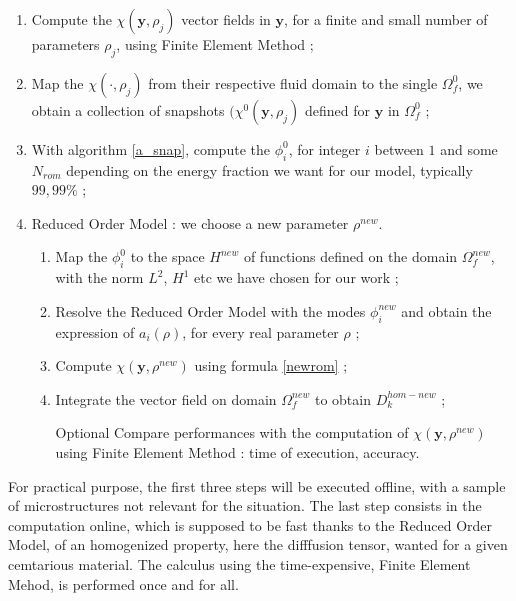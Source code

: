 \begin{algo}\label{a_rom}
\begin{enumerate}[label=\textbf{S \hspace{-7pt} \Roman*}]
\item Compute the $\chi\left(\mathbf{y},\rho_j\right)$ vector fields in $\mathbf{y}$, for a finite and small number of parameters $\rho_j$, %
using Finite Element Method ;
\item Map the $\chi (\cdot,\rho_j)$ from their respective fluid domain to the single $\Omega_f^0$, we obtain a collection of snapshots $(\chi^0(\mathbf{y},\rho_j)$ %
defined for $\mathbf{y}$ in $\Omega_f^0$ ;
\item With algorithm \ref{a_snap}, compute the $\phi^0_i$, for integer $i$ between $1$ and some $N_{rom}$ depending on the energy fraction we want for our model, typically $99,99\%$ ;
\item Reduced Order Model : we choose a new parameter $\rho^{new}$.
\begin{enumerate}[label=(\textbf{se}\ \roman*)]
\item Map the $\phi_i^0$ to the space $H^{new}$ of functions defined on the domain $\Omega_f^{new}$, with the norm $L^2$, $H^1$ etc we have chosen for our work ;
\item Resolve the Reduced Order Model with the modes $\phi_i^{new}$ and obtain the expression of $a_i(\rho)$, for every real parameter $\rho$ ;
\item Compute $\chi(\mathbf{y},\rho^{new})$ using formula \ref{newrom} ;
\item Integrate the vector field on domain $\Omega_f^{new}$ to obtain $D_k^{hom-new}$ ;
\item[Optional] Compare performances with the computation of $\chi(\mathbf{y},\rho^{new})$ using Finite Element Method : %
time of execution, accuracy.
\end{enumerate}
\end{enumerate}
\end{algo}

For practical purpose, the first three steps will be executed offline, with a sample of microstructures not relevant for the situation. %
The last step consists in the computation online, which is supposed to be fast thanks to the Reduced Order Model, %
of an homogenized property, here the difffusion tensor, wanted for a given cemtarious material.
The calculus using the time-expensive, Finite Element Mehod, is performed once and for all.